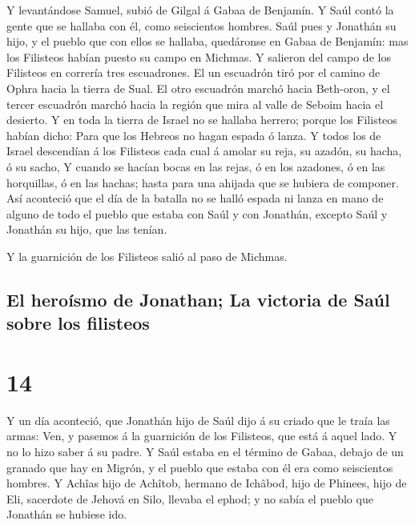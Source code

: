  Y levantándose Samuel, subió de Gilgal á Gabaa de
Benjamín. Y Saúl contó la gente que se hallaba con él, como seiscientos
hombres.  Saúl pues y Jonathán su hijo, y el pueblo que
con ellos se hallaba, quedáronse en Gabaa de Benjamín: mas los Filisteos
habían puesto su campo en Michmas.  Y salieron del campo
de los Filisteos en correría tres escuadrones. El un escuadrón tiró por
el camino de Ophra hacia la tierra de Sual.  El otro
escuadrón marchó hacia Beth-oron, y el tercer escuadrón marchó hacia la
región que mira al valle de Seboim hacia el desierto.  Y
en toda la tierra de Israel no se hallaba herrero; porque los Filisteos
habían dicho: Para que los Hebreos no hagan espada ó lanza.
 Y todos los de Israel descendían á los Filisteos cada
cual á amolar su reja, su azadón, su hacha, ó su sacho, 
Y cuando se hacían bocas en las rejas, ó en los azadones, ó en las
horquillas, ó en las hachas; hasta para una ahijada que se hubiera de
componer.  Así aconteció que el día de la batalla no se
halló espada ni lanza en mano de alguno de todo el pueblo que estaba con
Saúl y con Jonathán, excepto Saúl y Jonathán su hijo, que las tenían.

 Y la guarnición de los Filisteos salió al paso de
Michmas.

\hypertarget{el-herouxedsmo-de-jonathan-la-victoria-de-sauxfal-sobre-los-filisteos}{%
\subsection{El heroísmo de Jonathan; La victoria de Saúl sobre los
filisteos}\label{el-herouxedsmo-de-jonathan-la-victoria-de-sauxfal-sobre-los-filisteos}}

\hypertarget{section-09-14}{%
\section{14}\label{section-09-14}}

 Y un día aconteció, que Jonathán hijo de Saúl dijo á su
criado que le traía las armas: Ven, y pasemos á la guarnición de los
Filisteos, que está á aquel lado. Y no lo hizo saber á su padre.
 Y Saúl estaba en el término de Gabaa, debajo de un
granado que hay en Migrón, y el pueblo que estaba con él era como
seiscientos hombres.  Y Achîas hijo de Achîtob, hermano de
Ichâbod, hijo de Phinees, hijo de Eli, sacerdote de Jehová en Silo,
llevaba el ephod; y no sabía el pueblo que Jonathán se hubiese ido.

